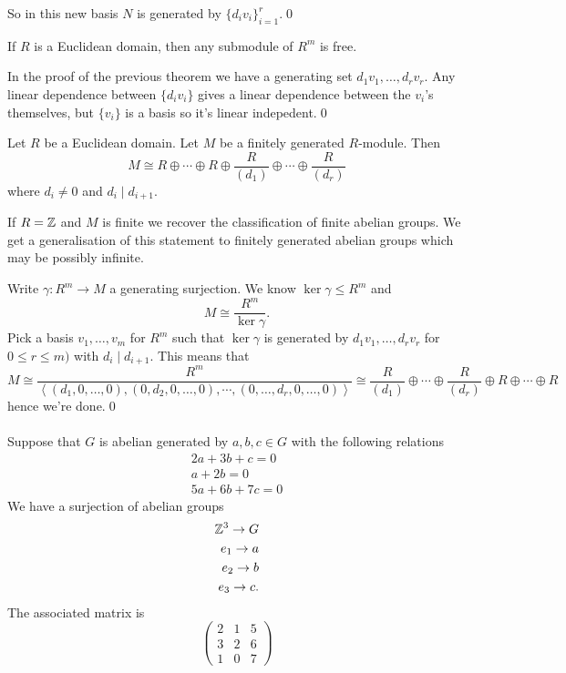 \documentclass{article}
\begin{document}
\begin{itemize}
\[\]
So in this new basis $ N $ is generated by $ \{d_iv_i\}^r_{i=1} $.\qed
\begin{theorem}
	If $ R $ is a Euclidean domain, then any submodule of $ R^m $ is free.
\end{theorem}
\pf In the proof of the previous theorem we have a generating set $ d_1v_1,\dots, d_rv_r $. Any linear dependence between $ \{d_iv_i\} $ gives a linear dependence between the $ v_i $'s themselves, but $ \{v_i\} $ is a basis so it's linear indepedent.\qed
\begin{theorem}
  Let $ R $ be a Euclidean domain. Let $ M $ be a finitely generated $ R $-module. Then
  \[
	  M\cong R\oplus \cdots \oplus R\oplus \frac R{(d_1)}\oplus \cdots \oplus\frac R{(d_r)}
  \]
  where $ d_i\ne 0 $ and $ d_i\mid d_{i+1} $.
\end{theorem}
\begin{remark}
  If $ R=\mathbb{Z} $ and $ M $ is finite we recover the classification of finite abelian groups. We get a generalisation of this statement to finitely generated abelian groups which may be possibly infinite.
\end{remark}
\pf Write $ \gamma:R^m\to M $ a generating surjection. We know $ \ker \gamma\le R^m $ and
\[
	M\cong \frac{R^m}{\ker \gamma}.
\]
Pick a basis $ v_1,\dots,v_m $ for $ R^m $ such that $ \ker\gamma $ is generated by $ d_1v_1,\dots,d_rv_r $ for $ 0\le r\le m) $ with $ d_i\mid d_{i+1} $. This means that \[
	M\cong\frac{R^m}{\left\langle(d_1,0,\dots,0),(0,d_2,0,\dots,0),\cdots,(0,\dots,d_r,0,\dots,0)\right\rangle}\cong \frac R{(d_1)}\oplus\cdots\oplus \frac R{(d_r)}\oplus R\oplus\cdots\oplus R
\]
hence we're done.\qed
\\\\
Suppose that $ G $ is abelian generated by $ a,b,c\in G $ with the following relations
\begin{align*}
  2a+3b+c=0 \\
  a+2b=0 \\
  5a+6b+7c=0
\end{align*}
We have a surjection of abelian groups
\begin{align*}
  \mathbb{Z}^3\to G\\
  e_1\to a\\
  e_2\to b\\
  e_3\to c.
\end{align*}
The associated matrix is
\[
  \begin{pmatrix}
	  2 & 1& 5 \\
	  3 & 2 & 6\\
	  1& 0 & 7

\end{pmatrix}\]
\end{itemize}
\end{document}
